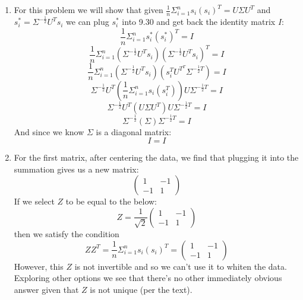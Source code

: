 \documentclass[11pt,a4paper]{article}
\begin{document}
\begin{itemize}
\begin{enumerate} [label={\alph*)}]
					\setcounter{equation}{0}
					\item For this problem we will show that given $\frac{1}{n} \Sigma_{i=1}^{n} s_i(s_i)^T = U \Sigma U^T$ and $s_{i}^{*} = \Sigma^{-\frac{1}{2}} U^T s_i$ we can plug $s_i^*$ into 9.30 and get back the identity matrix $I$:
						\begin{equation}
							\frac{1}{n} \Sigma_{i=1}^{n} s_i^*(s_i^*)^T = I
						\end{equation}
						\begin{equation}
							\frac{1}{n} \Sigma_{i=1}^{n} (\Sigma^{-\frac{1}{2}} U^T s_i)(\Sigma^{-\frac{1}{2}} U^T s_i)^T = I
						\end{equation}
						\begin{equation}
							\frac{1}{n} \Sigma_{i=1}^{n} (\Sigma^{-\frac{1}{2}} U^T s_i)(s_i^T  U^{T^T}  \Sigma^{-\frac{1}{2}T}) = I
						\end{equation}
						\begin{equation}
							\Sigma^{-\frac{1}{2}}U^T (\frac{1}{n} \Sigma_{i=1}^{n} s_i(s_i^T))U\Sigma^{-\frac{1}{2}T} = I
						\end{equation}
						\begin{equation}
							\Sigma^{-\frac{1}{2}}U^T (U \Sigma U^T) U\Sigma^{-\frac{1}{2}T} = I
						\end{equation}
						\begin{equation}
							\Sigma^{-\frac{1}{2}}(\Sigma )\Sigma^{-\frac{1}{2}T} = I
						\end{equation}
						And since we know $\Sigma$ is a diagonal matrix:
						\begin{equation}
							I = I
						\end{equation}
						
					\item For the first matrix, after centering the data, we find that plugging it into the summation gives us a new matrix: $$\begin{pmatrix}
						1 & -1 \\
						-1 & 1					
					\end{pmatrix}$$
					If we select $Z$ to be equal to the below:
					$$Z=\frac{1}{\sqrt{2}}
					\begin{pmatrix}
						1 & -1 \\
						-1 & 1					
					\end{pmatrix}$$ then we satisfy the condition $$ZZ^T = \frac{1}{n} \Sigma_{i=1}^{n} s_i(s_i)^T = \begin{pmatrix}
						1 & -1 \\
						-1 & 1					
					\end{pmatrix}$$ However, this $Z$ is not invertible and so we can't use it to whiten the data. Exploring other options we see that there's no other immediately obvious answer given that $Z$ is not unique (per the text).				
					

\end{enumerate}
\end{itemize}
\end{document}
